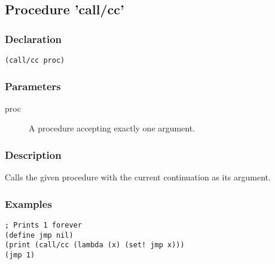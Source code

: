 \subsection{Procedure 'call/cc'}
\label{builtins/callcc}

\subsubsection*{Declaration}
\begin{lstlisting}
(call/cc proc)
\end{lstlisting}

\subsubsection*{Parameters}
\begin{description}
	\item[proc] A procedure accepting exactly one argument.
\end{description}

\subsubsection*{Description}
Calls the given procedure with the current continuation as its argument.

\subsubsection*{Examples}
\begin{lstlisting}
; Prints 1 forever
(define jmp nil)
(print (call/cc (lambda (x) (set! jmp x)))
(jmp 1)
\end{lstlisting}
